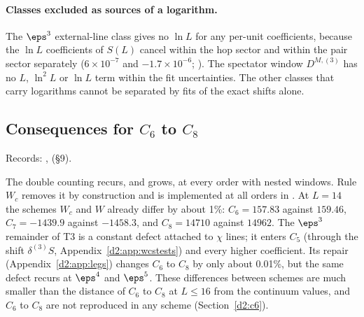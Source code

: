 \paragraph{Classes excluded as sources of a logarithm.} The $\eps^3$ external-line class gives no $\ln L$ for any per-unit
coefficients, because the $\ln L$ coefficients of $S(L)$ cancel within the hop sector and within the pair sector separately
($6\times10^{-7}$ and $-1.7\times10^{-6}$; ). The spectator window $D^{M,(3)}$ has no $L$, $\ln^2L$ or
$\ln L$ term within the fit uncertainties. The other classes that carry logarithms cannot be separated by fits of the exact shifts alone.

\subsection{Consequences for \texorpdfstring{$C_6$}{C6} to \texorpdfstring{$C_8$}{C8}}\label{d2:app:c6eps5}
{\small\raggedright\noindent Records: , 
(\S9).\par}

The double counting recurs, and grows, at every order with nested windows. Rule $W_c$ removes it by construction and is
implemented at all orders in . At $L=14$ the schemes $W_c$ and $W$ already differ by about 1\%:
$C_6=157.83$ against $159.46$, $C_7=-1439.9$ against $-1458.3$, and $C_8=14710$ against $14962$. The $\eps^3$ remainder of T3
is a constant defect attached to $\chi$ lines; it enters $C_5$ (through the shift $\delta^{(3)}S$,
Appendix~\ref{d2:app:wcstests}) and every higher coefficient. Its repair (Appendix~\ref{d2:app:legs}) changes $C_6$ to $C_8$ by
only about 0.01\%, but the same defect recurs at $\eps^4$ and $\eps^5$. These differences between schemes are much smaller than
the distance of $C_6$ to $C_8$ at $L\le16$ from the continuum values, and $C_6$ to $C_8$ are not reproduced in any scheme
(Section~\ref{d2:c6}).
